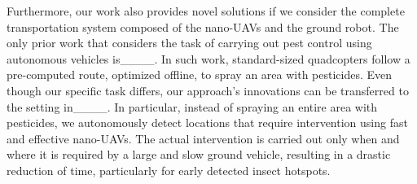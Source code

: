 Furthermore, our work also provides novel solutions if we consider the complete transportation system composed of the nano-UAVs and the ground robot. 
The only prior work that considers the task of carrying out pest control using autonomous vehicles is____. 
In such work, standard-sized quadcopters follow a pre-computed route, optimized offline, to spray an area with pesticides. 
Even though our specific task differs, our approach's innovations can be transferred to the setting in____. 
In particular, instead of spraying an entire area with pesticides, we autonomously detect locations that require intervention using fast and effective nano-UAVs. 
The actual intervention is carried out only when and where it is required by a large and slow ground vehicle, resulting in a drastic reduction of time, particularly for early detected insect hotspots.